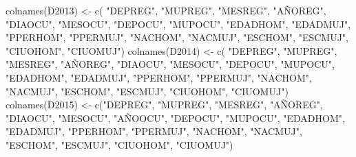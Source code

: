 \documentclass[
]{article}
\newenvironment{Shaded}{\begin{snugshade}}{\end{snugshade}}
\newcommand{\FunctionTok}[1]{\textcolor[rgb]{0.00,0.00,0.00}{#1}}
\newcommand{\NormalTok}[1]{#1}
\newcommand{\OtherTok}[1]{\textcolor[rgb]{0.56,0.35,0.01}{#1}}
\newcommand{\StringTok}[1]{\textcolor[rgb]{0.31,0.60,0.02}{#1}}
\begin{document}
\begin{Shaded}
\begin{Highlighting}[]
\FunctionTok{colnames}\NormalTok{(D2013) }\OtherTok{\textless{}{-}} \FunctionTok{c}\NormalTok{( }\StringTok{"DEPREG"}\NormalTok{,  }\StringTok{"MUPREG"}\NormalTok{,  }\StringTok{"MESREG"}\NormalTok{,  }\StringTok{"AÑOREG"}\NormalTok{,  }\StringTok{"DIAOCU"}\NormalTok{,  }\StringTok{"MESOCU"}\NormalTok{,  }\StringTok{"DEPOCU"}\NormalTok{,  }\StringTok{"MUPOCU"}\NormalTok{,  }\StringTok{"EDADHOM"}\NormalTok{, }\StringTok{"EDADMUJ"}\NormalTok{, }\StringTok{"PPERHOM"}\NormalTok{,  }\StringTok{"PPERMUJ"}\NormalTok{,  }\StringTok{"NACHOM"}\NormalTok{,  }\StringTok{"NACMUJ"}\NormalTok{,  }\StringTok{"ESCHOM"}\NormalTok{,  }\StringTok{"ESCMUJ"}\NormalTok{,  }\StringTok{"CIUOHOM"}\NormalTok{, }\StringTok{"CIUOMUJ"}\NormalTok{)}
\FunctionTok{colnames}\NormalTok{(D2014) }\OtherTok{\textless{}{-}} \FunctionTok{c}\NormalTok{( }\StringTok{"DEPREG"}\NormalTok{,  }\StringTok{"MUPREG"}\NormalTok{,  }\StringTok{"MESREG"}\NormalTok{,  }\StringTok{"AÑOREG"}\NormalTok{,  }\StringTok{"DIAOCU"}\NormalTok{,  }\StringTok{"MESOCU"}\NormalTok{,  }\StringTok{"DEPOCU"}\NormalTok{,  }\StringTok{"MUPOCU"}\NormalTok{, }\StringTok{"EDADHOM"}\NormalTok{, }\StringTok{"EDADMUJ"}\NormalTok{, }\StringTok{"PPERHOM"}\NormalTok{,  }\StringTok{"PPERMUJ"}\NormalTok{,  }\StringTok{"NACHOM"}\NormalTok{,  }\StringTok{"NACMUJ"}\NormalTok{,  }\StringTok{"ESCHOM"}\NormalTok{,  }\StringTok{"ESCMUJ"}\NormalTok{,  }\StringTok{"CIUOHOM"}\NormalTok{, }\StringTok{"CIUOMUJ"}\NormalTok{)}
\FunctionTok{colnames}\NormalTok{(D2015) }\OtherTok{\textless{}{-}} \FunctionTok{c}\NormalTok{(}\StringTok{"DEPREG"}\NormalTok{,  }\StringTok{"MUPREG"}\NormalTok{,  }\StringTok{"MESREG"}\NormalTok{,  }\StringTok{"AÑOREG"}\NormalTok{,  }\StringTok{"DIAOCU"}\NormalTok{,  }\StringTok{"MESOCU"}\NormalTok{,  }\StringTok{"AÑOOCU"}\NormalTok{,  }\StringTok{"DEPOCU"}\NormalTok{,  }\StringTok{"MUPOCU"}\NormalTok{,  }\StringTok{"EDADHOM"}\NormalTok{, }\StringTok{"EDADMUJ"}\NormalTok{, }\StringTok{"PPERHOM"}\NormalTok{, }\StringTok{"PPERMUJ"}\NormalTok{,  }\StringTok{"NACHOM"}\NormalTok{, }\StringTok{"NACMUJ"}\NormalTok{,  }\StringTok{"ESCHOM"}\NormalTok{,  }\StringTok{"ESCMUJ"}\NormalTok{,  }\StringTok{"CIUOHOM"}\NormalTok{, }\StringTok{"CIUOMUJ"}\NormalTok{)}
\end{Highlighting}
\end{Shaded}
\end{document}
